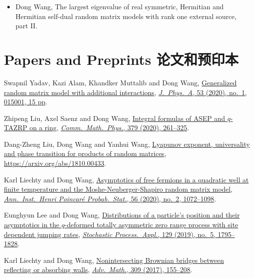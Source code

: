 \documentclass[12pt,a4paper]{article}
\begin{document}
\begin{itemize}
\item
  Dong Wang, The largest eigenvalue of real symmetric, Hermitian and Hermitian self-dual random matrix models with rank one external source, part II.
\end{itemize}

\section*{Papers and Preprints 论文和预印本}

\begin{etaremune}
\item
  Swapnil Yadav, Kazi Alam, Khandker Muttalib and Dong Wang, \href{https://arxiv.org/abs/1908.03726}{Generalized random matrix model with additional interactions}, \href{https://dx.doi.org/10.1088/1751-8121/ab56e0}{\textit{J.\ Phys.\ A}, 53 (2020), no.\ 1, 015001, 15 pp}.
\item
  Zhipeng Liu, Axel Saenz and Dong Wang, \href{https://arxiv.org/abs/1905.02987}{Integral formulas of ASEP and $q$-TAZRP on a ring}, \href{https://doi.org/10.1007/s00220-020-03837-7}{\textit{Comm.\ Math.\ Phys.}, 379 (2020), 261--325}.
\item
  Dang-Zheng Liu, Dong Wang and Yanhui Wang, \href{https://arxiv.org/abs/1810.00433}{Lyapunov exponent, universality and phase transition for products of random matrices}, \url{https://arxiv.org/abs/1810.00433}.
\item
  Karl Liechty and Dong Wang, \href{https://arxiv.org/abs/1706.06653}{Asymptotics of free fermions in a quadratic well at finite temperature and the Moshe-Neuberger-Shapiro random matrix model}, \href{https://doi.org/10.1214/19-AIHP994}{\textit{Ann.\ Inst.\ Henri Poincar\'{e} Probab.\ Stat.}, 56 (2020), no.\ 2, 1072--1098}.
\item
  Eunghyun Lee and Dong Wang, \href{https://arxiv.org/abs/1703.08839}{Distributions of a particle's position and their asymptotics in the $q$-deformed totally asymmetric zero range process with site dependent jumping rates}, \href{https://doi.org/10.1016/j.spa.2018.06.005}{\textit{Stochastic Process.\ Appl.}, 129 (2019), no.\ 5, 1795--1828}.
\item
  Karl Liechty and Dong Wang, \href{http://arxiv.org/abs/1608.08712}{Nonintersecting Brownian bridges between reflecting or absorbing walls}, \href{https://doi.org/10.1016/j.aim.2016.10.024}{\textit{Adv.\ Math.}, 309 (2017), 155--208}.
\item

\end{etaremune}
\end{document}
